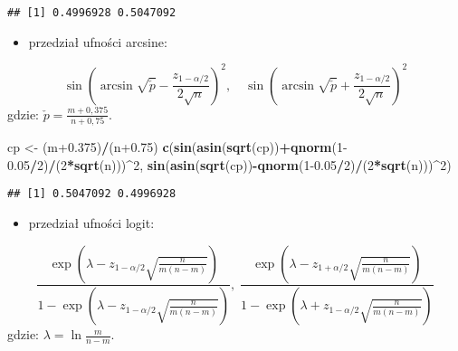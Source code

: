 \documentclass[polish,]{book}
\newenvironment{Shaded}{\begin{snugshade}}{\end{snugshade}}
\newcommand{\DecValTok}[1]{\textcolor[rgb]{0.00,0.00,0.81}{#1}}
\newcommand{\FloatTok}[1]{\textcolor[rgb]{0.00,0.00,0.81}{#1}}
\newcommand{\KeywordTok}[1]{\textcolor[rgb]{0.13,0.29,0.53}{\textbf{#1}}}
\newcommand{\NormalTok}[1]{#1}
\newcommand{\OperatorTok}[1]{\textcolor[rgb]{0.81,0.36,0.00}{\textbf{#1}}}
\newcommand{\StringTok}[1]{\textcolor[rgb]{0.31,0.60,0.02}{#1}}
\providecommand{\tightlist}{%
  \setlength{\itemsep}{0pt}\setlength{\parskip}{0pt}}
\begin{document}
\begin{verbatim}
## [1] 0.4996928 0.5047092
\end{verbatim}

\begin{itemize}
\tightlist
\item
  przedział ufności arcsine:
\end{itemize}

\begin{equation}
\sin\left(\arcsin\sqrt{\check{p}}-\frac{z_{1-\alpha/2}}{2\sqrt{n}}\right)^2,\quad\sin\left(\arcsin\sqrt{\check{p}}+\frac{z_{1-\alpha/2}}{2\sqrt{n}}\right)^2
\label{eq:wz1162}
\end{equation}
gdzie: \(\check{p}=\frac{m+0,375}{n+0,75}\).

\begin{Shaded}
\begin{Highlighting}[]
\NormalTok{cp <-}\StringTok{ }\NormalTok{(m}\FloatTok{+0.375}\NormalTok{)}\OperatorTok{/}\NormalTok{(n}\FloatTok{+0.75}\NormalTok{)}
\KeywordTok{c}\NormalTok{(}\KeywordTok{sin}\NormalTok{(}\KeywordTok{asin}\NormalTok{(}\KeywordTok{sqrt}\NormalTok{(cp))}\OperatorTok{+}\KeywordTok{qnorm}\NormalTok{(}\DecValTok{1}\FloatTok{-0.05}\OperatorTok{/}\DecValTok{2}\NormalTok{)}\OperatorTok{/}\NormalTok{(}\DecValTok{2}\OperatorTok{*}\KeywordTok{sqrt}\NormalTok{(n)))}\OperatorTok{^}\DecValTok{2}\NormalTok{,}
  \KeywordTok{sin}\NormalTok{(}\KeywordTok{asin}\NormalTok{(}\KeywordTok{sqrt}\NormalTok{(cp))}\OperatorTok{-}\KeywordTok{qnorm}\NormalTok{(}\DecValTok{1}\FloatTok{-0.05}\OperatorTok{/}\DecValTok{2}\NormalTok{)}\OperatorTok{/}\NormalTok{(}\DecValTok{2}\OperatorTok{*}\KeywordTok{sqrt}\NormalTok{(n)))}\OperatorTok{^}\DecValTok{2}\NormalTok{)}
\end{Highlighting}
\end{Shaded}

\begin{verbatim}
## [1] 0.5047092 0.4996928
\end{verbatim}

\begin{itemize}
\tightlist
\item
  przedział ufności logit:
\end{itemize}

\begin{equation}
\frac{\exp\left(\lambda-z_{1-\alpha/2}\sqrt{\frac{n}{m(n-m)}}\right)}{1-\exp\left(\lambda-z_{1-\alpha/2}\sqrt{\frac{n}{m(n-m)}}\right)},\;
\frac{\exp\left(\lambda-z_{1+\alpha/2}\sqrt{\frac{n}{m(n-m)}}\right)}{1-\exp\left(\lambda+z_{1-\alpha/2}\sqrt{\frac{n}{m(n-m)}}\right)}
\label{eq:wz1163}
\end{equation}
gdzie: \(\lambda=\ln\frac{m}{n-m}\).
\end{document}
